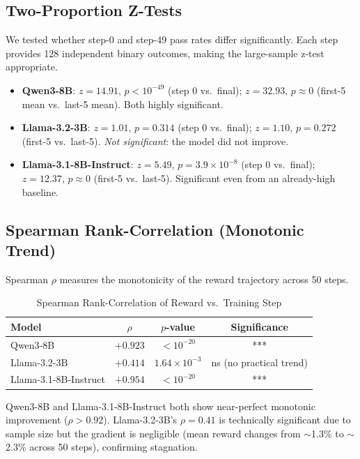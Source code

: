 \documentclass[12pt,a4paper]{report}
\theoremstyle{definition}
\begin{document}
\subsection{Two-Proportion Z-Tests}

We tested whether step-0 and step-49 pass rates differ significantly.  Each step provides 128 independent binary outcomes, making the large-sample z-test appropriate.

\begin{itemize}
    \item \textbf{Qwen3-8B}: $z = 14.91$, $p < 10^{-49}$ (step 0 vs.\ final); $z = 32.93$, $p \approx 0$ (first-5 mean vs.\ last-5 mean).  Both highly significant.
    \item \textbf{Llama-3.2-3B}: $z = 1.01$, $p = 0.314$ (step 0 vs.\ final); $z = 1.10$, $p = 0.272$ (first-5 vs.\ last-5). \emph{Not significant}: the model did not improve.
    \item \textbf{Llama-3.1-8B-Instruct}: $z = 5.49$, $p = 3.9 \times 10^{-8}$ (step 0 vs.\ final); $z = 12.37$, $p \approx 0$ (first-5 vs.\ last-5). Significant even from an already-high baseline.
\end{itemize}

\subsection{Spearman Rank-Correlation (Monotonic Trend)}

Spearman $\rho$ measures the monotonicity of the reward trajectory across 50 steps.

\begin{table}[htbp]
\centering
\caption{Spearman Rank-Correlation of Reward vs.\ Training Step}
\label{tab:spearman}
\begin{tabular}{lccc}
\toprule
\textbf{Model} & $\rho$ & $p$-value & Significance \\
\midrule
Qwen3-8B              & $+0.923$ & $< 10^{-20}$ & *** \\
Llama-3.2-3B          & $+0.414$ & $1.64 \times 10^{-3}$ & ns (no practical trend) \\
Llama-3.1-8B-Instruct & $+0.954$ & $< 10^{-20}$ & *** \\
\bottomrule
\end{tabular}
\end{table}

Qwen3-8B and Llama-3.1-8B-Instruct both show near-perfect monotonic improvement ($\rho > 0.92$).  Llama-3.2-3B's $\rho = 0.41$ is technically significant due to sample size but the gradient is negligible (mean reward changes from $\sim$1.3\% to $\sim$2.3\% across 50 steps), confirming stagnation.
\end{document}
